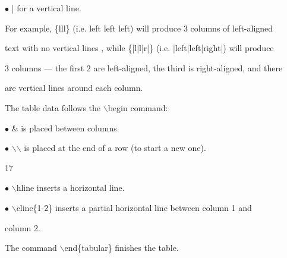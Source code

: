 \documentclass[a4paper,portrait,12pt]{article}
\begin{document}
\begin{flushleft}
$\bullet$ | for a vertical line.
\end{flushleft}


\begin{flushleft}
For example, \{lll\} (i.e. left left left) will produce 3 columns of left-aligned
\end{flushleft}


\begin{flushleft}
text with no vertical lines , while \{|l|l|r|\} (i.e. |left|left|right|) will produce
\end{flushleft}


\begin{flushleft}
3 columns --- the first 2 are left-aligned, the third is right-aligned, and there
\end{flushleft}


\begin{flushleft}
are vertical lines around each column.
\end{flushleft}


\begin{flushleft}
The table data follows the \ensuremath{\backslash}begin command:
\end{flushleft}


\begin{flushleft}
$\bullet$ \& is placed between columns.
\end{flushleft}


\begin{flushleft}
$\bullet$ \ensuremath{\backslash}\ensuremath{\backslash} is placed at the end of a row (to start a new one).
\end{flushleft}


17





\begin{flushleft}
\newpage
$\bullet$ \ensuremath{\backslash}hline inserts a horizontal line.
\end{flushleft}


\begin{flushleft}
$\bullet$ \ensuremath{\backslash}cline\{1-2\} inserts a partial horizontal line between column 1 and
\end{flushleft}


\begin{flushleft}
column 2.
\end{flushleft}


\begin{flushleft}
The command \ensuremath{\backslash}end\{tabular\} finishes the table.
\end{flushleft}
\end{document}
